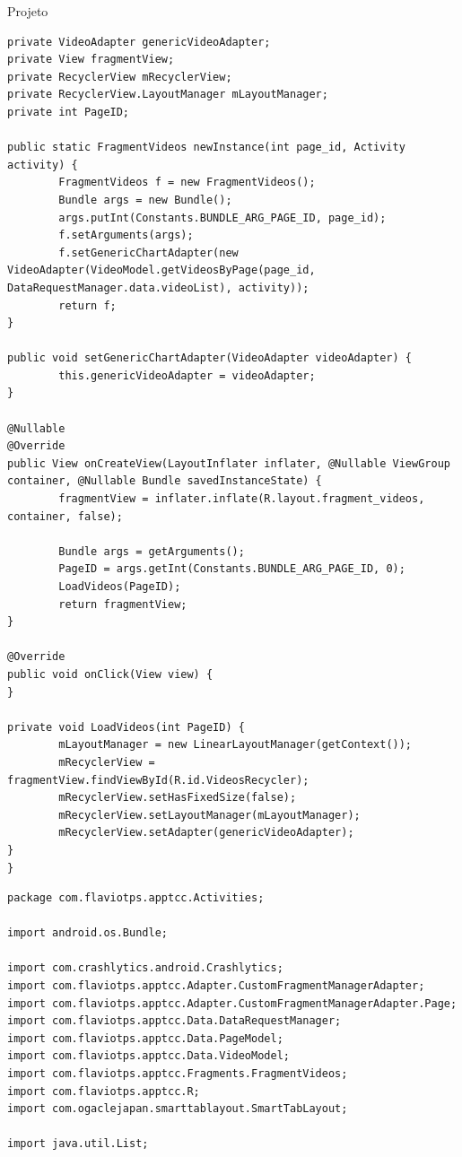 \documentclass[
	12pt,				%
	openright,			%
	twoside,			%
	a4paper,			%
	english,			%
	french,				%
	spanish,			%
	brazil				%
	]{abntex2}
\begin{document}
\begin{chapter}{Projeto}
\begin{lstlisting}[numbers=none,basicstyle=\small,
caption={FragmentVideos.java},
title={FragmentVideos.java},
label={FragmentVideos.java}]
private VideoAdapter genericVideoAdapter;
private View fragmentView;
private RecyclerView mRecyclerView;
private RecyclerView.LayoutManager mLayoutManager;
private int PageID;

public static FragmentVideos newInstance(int page_id, Activity activity) {
		FragmentVideos f = new FragmentVideos();
		Bundle args = new Bundle();
		args.putInt(Constants.BUNDLE_ARG_PAGE_ID, page_id);
		f.setArguments(args);
		f.setGenericChartAdapter(new VideoAdapter(VideoModel.getVideosByPage(page_id, DataRequestManager.data.videoList), activity));
		return f;
}

public void setGenericChartAdapter(VideoAdapter videoAdapter) {
		this.genericVideoAdapter = videoAdapter;
}

@Nullable
@Override
public View onCreateView(LayoutInflater inflater, @Nullable ViewGroup container, @Nullable Bundle savedInstanceState) {
		fragmentView = inflater.inflate(R.layout.fragment_videos, container, false);

		Bundle args = getArguments();
		PageID = args.getInt(Constants.BUNDLE_ARG_PAGE_ID, 0);
		LoadVideos(PageID);
		return fragmentView;
}

@Override
public void onClick(View view) {
}

private void LoadVideos(int PageID) {
		mLayoutManager = new LinearLayoutManager(getContext());
		mRecyclerView = fragmentView.findViewById(R.id.VideosRecycler);
		mRecyclerView.setHasFixedSize(false);
		mRecyclerView.setLayoutManager(mLayoutManager);
		mRecyclerView.setAdapter(genericVideoAdapter);
}
}

\end{lstlisting}

\begin{lstlisting}[numbers=none,basicstyle=\small,
caption={ActivityVideos.java},
title={ActivityVideos.java},
label={ActivityVideos.java}]
package com.flaviotps.apptcc.Activities;

import android.os.Bundle;

import com.crashlytics.android.Crashlytics;
import com.flaviotps.apptcc.Adapter.CustomFragmentManagerAdapter;
import com.flaviotps.apptcc.Adapter.CustomFragmentManagerAdapter.Page;
import com.flaviotps.apptcc.Data.DataRequestManager;
import com.flaviotps.apptcc.Data.PageModel;
import com.flaviotps.apptcc.Data.VideoModel;
import com.flaviotps.apptcc.Fragments.FragmentVideos;
import com.flaviotps.apptcc.R;
import com.ogaclejapan.smarttablayout.SmartTabLayout;

import java.util.List;


\end{lstlisting}
\end{chapter}
\end{document}
